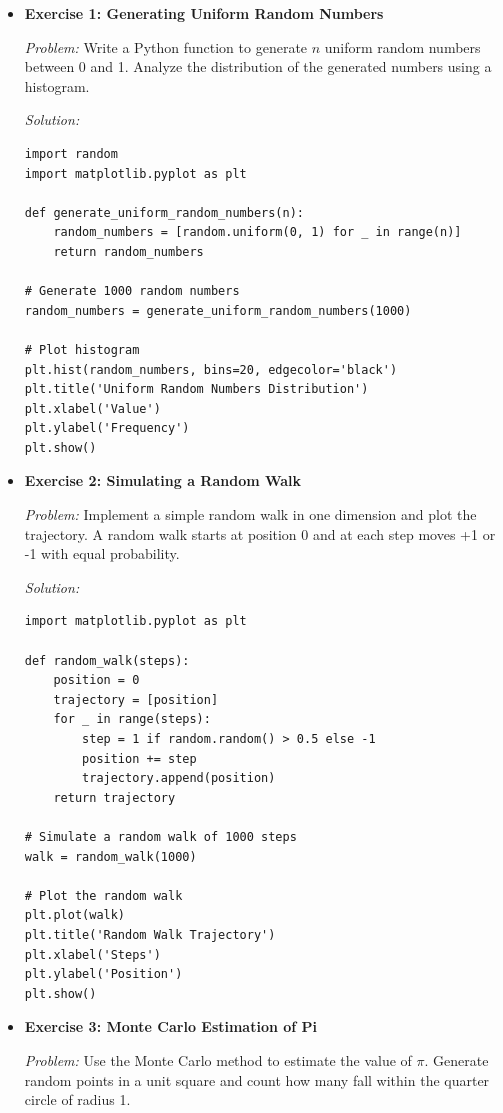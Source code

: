 \documentclass[12pt]{book} %
\begin{document}
\begin{itemize}
    \item \textbf{Exercise 1: Generating Uniform Random Numbers}
    
    \textit{Problem:} Write a Python function to generate $n$ uniform random numbers between 0 and 1. Analyze the distribution of the generated numbers using a histogram.

    \textit{Solution:}
    
    \begin{lstlisting}
import random
import matplotlib.pyplot as plt

def generate_uniform_random_numbers(n):
    random_numbers = [random.uniform(0, 1) for _ in range(n)]
    return random_numbers

# Generate 1000 random numbers
random_numbers = generate_uniform_random_numbers(1000)

# Plot histogram
plt.hist(random_numbers, bins=20, edgecolor='black')
plt.title('Uniform Random Numbers Distribution')
plt.xlabel('Value')
plt.ylabel('Frequency')
plt.show()
    \end{lstlisting}
    \FloatBarrier

    \item \textbf{Exercise 2: Simulating a Random Walk}
    
    \textit{Problem:} Implement a simple random walk in one dimension and plot the trajectory. A random walk starts at position 0 and at each step moves +1 or -1 with equal probability.

    \textit{Solution:}
    
    \begin{lstlisting}
import matplotlib.pyplot as plt

def random_walk(steps):
    position = 0
    trajectory = [position]
    for _ in range(steps):
        step = 1 if random.random() > 0.5 else -1
        position += step
        trajectory.append(position)
    return trajectory

# Simulate a random walk of 1000 steps
walk = random_walk(1000)

# Plot the random walk
plt.plot(walk)
plt.title('Random Walk Trajectory')
plt.xlabel('Steps')
plt.ylabel('Position')
plt.show()
    \end{lstlisting}
    \FloatBarrier

    \item \textbf{Exercise 3: Monte Carlo Estimation of Pi}
    
    \textit{Problem:} Use the Monte Carlo method to estimate the value of $\pi$. Generate random points in a unit square and count how many fall within the quarter circle of radius 1.


\end{itemize}
\end{document}

